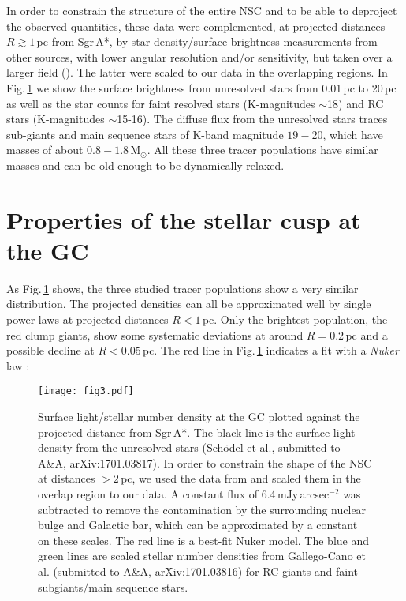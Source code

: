 \documentclass[a4paper]{jpconf}
\begin{document}
In order to constrain the structure of the entire NSC and to be able
to deproject the observed quantities, these data were complemented, at
projected distances $R\gtrsim1$\,pc from Sgr\,A*, by star
density/surface brightness measurements from other sources, with lower
angular resolution and/or sensitivity, but taken over a larger field
(\cite{Schodel:2014fk,Fritz:2016fj}). The latter were scaled to our
data in the overlapping regions. In Fig.\,\ref{Sigmanuker} we show the
surface brightness from unresolved stars from 0.01\,pc to 20\,pc as
well as the star counts for faint resolved stars (K-magnitudes
$\sim$18) and RC stars (K-magnitudes $\sim$15-16). The diffuse
flux from the unresolved stars traces sub-giants and main sequence
stars of K-band magnitude $19-20$, which have masses of about
$0.8-1.8$\,M$_{\odot}$. All these three tracer populations have
similar masses and can be old enough to be dynamically relaxed.


\section{Properties of the stellar cusp at the GC}

As Fig.\,\ref{Sigmanuker} shows, the three studied tracer populations
show a very similar distribution. The projected densities can all be
approximated well by single power-laws at projected distances $R<1$\,pc. Only
the brightest population, the red clump giants, show some systematic
deviations at around $R=0.2$\,pc and a possible decline at
$R<0.05$\,pc. The red line in Fig.\,\ref{Sigmanuker} indicates a fit
with a {\it Nuker} law \cite{Lauer:1995fk}:

\begin{figure}[htb]
\label{Sigmanuker}
\texttt{[image: fig3.pdf]}
\caption{Surface light/stellar number density at the GC plotted
  against the projected distance from Sgr\,A*. The black line is the
  surface light density from the unresolved stars (Sch{\"o}del et al.,
  submitted to A\&A,  arXiv:1701.03817). In order to constrain the shape of the NSC at
  distances $> 2$\,pc, we used the data from \cite{Fritz:2016fj} and
  scaled them in the overlap region to our data. A constant flux of
  6.4\,mJy\,arcsec$^{-2}$ was subtracted to remove the contamination
  by the surrounding nuclear bulge and Galactic bar, which can be
  approximated by a constant on these scales.  The red line is a
  best-fit Nuker model. The blue and green lines are scaled stellar
  number densities from Gallego-Cano et al. (submitted to A\&A, arXiv:1701.03816) for RC
  giants and faint subgiants/main sequence stars. }
\end{figure}
 
\end{document}

